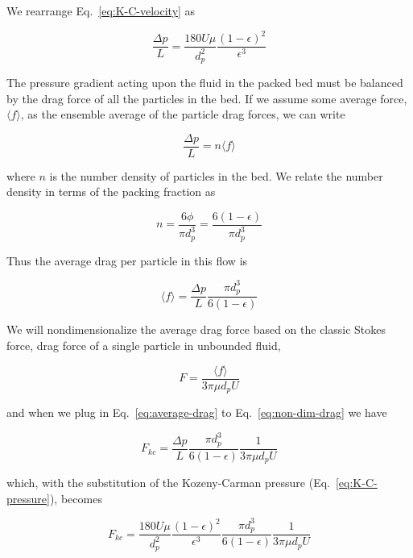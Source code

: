We rearrange Eq.~\ref{eq:K-C-velocity} as

\begin{equation}\label{eq:K-C-pressure}
	\frac{\Delta p}{L} = \frac{180 U \mu}{d_p^2} \frac{(1-\epsilon)^2}{\epsilon^3}
\end{equation}

The pressure gradient acting upon the fluid in the packed bed must be balanced by the drag force of all the particles in the bed. If we assume some average force, $\langle f \rangle$, as the ensemble average of the particle drag forces, we can write

\begin{equation}
	\frac{\Delta p}{L} = n \langle f \rangle
\end{equation}

where $n$ is the number density of particles in the bed. We relate the number density in terms of the packing fraction as

\begin{equation}
	n = \frac{6\phi}{\pi d_p^3} = \frac{6(1-\epsilon)}{\pi d_p^3}
\end{equation}

Thus the average drag per particle in this flow is

\begin{equation}\label{eq:average-drag}
	\langle f \rangle = \frac{\Delta p}{L}\frac{\pi d_p^3}{6(1-\epsilon)}
\end{equation}

We will nondimensionalize the average drag force based on the classic Stokes force, drag force of a single particle in unbounded fluid,

\begin{equation}\label{eq:non-dim-drag}
	F = \frac{\langle f \rangle}{3\pi \mu d_p U}
\end{equation}

and when we plug in Eq.~\ref{eq:average-drag} to Eq.~\ref{eq:non-dim-drag} we have

\begin{equation}
	F_{kc} = \frac{\Delta p}{L}\frac{\pi d_p^3}{6(1-\epsilon)}\frac{1}{3\pi \mu d_p U}
\end{equation}

which, with the substitution of the Kozeny-Carman pressure (Eq.~\ref{eq:K-C-pressure}), becomes

\begin{equation}
	F_{kc} = \frac{180 U \mu}{d_p^2} \frac{(1-\epsilon)^2}{\epsilon^3}\frac{\pi d_p^3}{6(1-\epsilon)}\frac{1}{3\pi \mu d_p U}
\end{equation}

